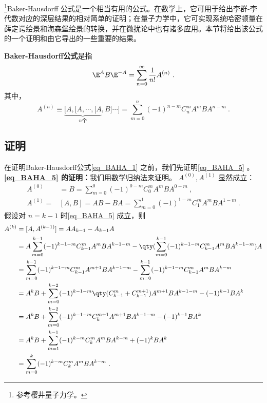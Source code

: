 \begin{issues}
\end{issues}


\footnote{参考樱井量子力学\cite{Sakurai}。}Baker-Hausdorff 公式是一个相当有用的公式。在数学上，它可用于给出李群-李代数对应的深层结果的相对简单的证明；在量子力学中，它可实现系统哈密顿量在薛定谔绘景和海森堡绘景的转换，并在微扰论中也有诸多应用。本节将给出该公式的一个证明和由它导出的一些重要的结果。

\textbf{Baker-Hausdorff公式}是指
\begin{equation}\label{eq_BAHA_1}
\E ^{A}B\E^{-A}=\sum_{n=0}^{\infty}\frac{1}{n!}A^{(n)}~.
\end{equation}
其中，
\begin{equation}\label{eq_BAHA_5}
A^{(n)}\equiv\underbrace{[A,[A,\cdots,[A}_{n\text{个}},B]\cdots]
=\sum_{m=0}^{n}(-1)^{n-m}C_{n}^{m}A^mBA^{n-m}~.
\end{equation}


\subsection{证明}
在证明Baker-Hausdorff公式\autoref{eq_BAHA_1} 之前，我们先证明\autoref{eq_BAHA_5} 。\\

\textbf{\autoref{eq_BAHA_5} 的证明：}我们用数学归纳法来证明。
$A^{(0)},A^{(1)}$ 显然成立：
\begin{equation}
\begin{aligned}
A^{(0)}&=B=\sum_{m=0}^{0}(-1)^{0-m}C_{0}^{m}A^mBA^{0-m}~,\\
A^{(1)}=&[A,B]=AB-BA=\sum_{m=0}^{1}(-1)^{1-m}C_{1}^{m}A^mBA^{1-m}~.
\end{aligned}
\end{equation}
假设对 $n=k-1$ 时\autoref{eq_BAHA_5} 成立，则
\begin{equation}
\begin{aligned}
A^{(k)}&=[A,A^{(k-1)}]=AA_{k-1}-A_{k-1}A\\
&=A\sum_{m=0}^{k-1}(-1)^{k-1-m}C_{k-1}^{m}A^mBA^{k-1-m}-\qty(\sum_{m=0}^{k-1}(-1)^{k-1-m}C_{k-1}^{m}A^mBA^{k-1-m})A\\
&=\sum_{m=0}^{k-1}(-1)^{k-1-m}C_{k-1}^{m}A^{m+1}BA^{k-1-m}-\sum_{m=0}^{k-1}(-1)^{k-1-m}C_{k-1}^{m}A^mBA^{k-m}\\
&=A^{k}B+\sum_{m=0}^{k-2}(-1)^{k-1-m}\qty(C_{k-1}^{m}+C_{k-1}^{m+1})A^{m+1}BA^{k-1-m}-(-1)^{k-1}BA^k\\
&=A^{k}B+\sum_{m=0}^{k-2}(-1)^{k-1-m}C_{k}^{m+1}A^{m+1}BA^{k-1-m}-(-1)^{k-1}BA^k\\
&=A^{k}B+\sum_{m=1}^{k-1}(-1)^{k-m}C_{k}^{m}A^{m}BA^{k-m}+(-1)^{k}BA^k\\
&=\sum_{m=0}^{k}(-1)^{k-m}C_{k}^{m}A^{m}BA^{k-m}~.
\end{aligned}
\end{equation}


